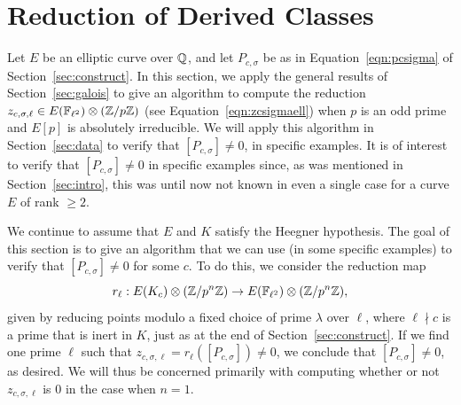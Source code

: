 \documentclass{article} \usepackage[active]{srcltx}
\begin{document}
\section{Reduction of Derived Classes}\label{sec:red}

Let $E$ be an elliptic curve over $\mathbb{Q}$, and let $P_{c,\sigma}$ be as
in Equation~\eqref{eqn:pcsigma} of Section~\ref{sec:construct}.  In
this section, we apply the general results of Section~\ref{sec:galois}
to give an algorithm to compute the reduction $z_{c,\sigma,\ell} \in
E(\mathbb{F}_{\ell^2})\otimes(\mathbb{Z}/p\mathbb{Z})$ (see Equation~\ref{eqn:zcsigmaell})
when $p$ is an odd prime and $E[p]$ is absolutely irreducible.  We
will apply this algorithm in Section~\ref{sec:data} to verify that
$[P_{c,\sigma}]\neq 0$, in specific examples.  It is of interest to
verify that $[P_{c,\sigma}]\neq 0$ in specific examples since, as was
mentioned in Section~\ref{sec:intro}, this was until now not known in
even a single case for a curve $E$ of rank $\geq 2$.

We continue to assume that $E$ and $K$ satisfy the Heegner hypothesis.
The goal of this section is to give an algorithm that we can use (in
some specific examples) to verify that $[P_{c,\sigma}] \neq 0$ for
some $c$.  To do this, we consider the reduction map
\begin{equation}\label{eqn:red}
r_{\ell}: E(K_c)\otimes(\mathbb{Z}/p^n\mathbb{Z})  \to E(\mathbb{F}_{\ell^2})\otimes (\mathbb{Z}/p^n\mathbb{Z}),
\end{equation}
given by reducing points
modulo a fixed choice of prime $\lambda$ over $\ell$, where $\ell\nmid
c$ is a prime that is inert in $K$, just as at the end of
Section~\ref{sec:construct}.  If we find one prime $\ell$ such that
$z_{c,\sigma,\ell} = r_{\ell}([P_{c,\sigma}])\neq 0$, we conclude that
$[P_{c,\sigma}] \neq 0$, as desired.  We will thus be concerned
primarily with computing whether or not $z_{c,\sigma,\ell}$ is $0$ in
the case when $n=1$.
\end{document}
